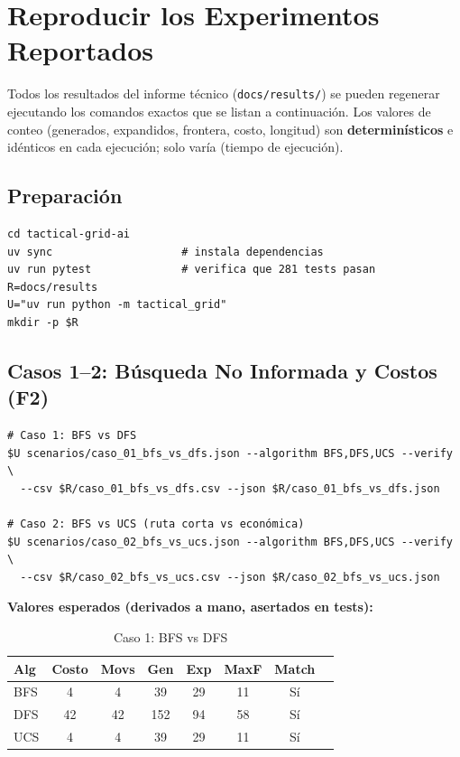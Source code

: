 \chapter{Reproducir los Experimentos Reportados}
\label{man:reproducir}

Todos los resultados del informe técnico (\texttt{docs/results/}) se pueden regenerar
ejecutando los comandos exactos que se listan a continuación. Los valores de conteo
(generados, expandidos, frontera, costo, longitud) son \textbf{determinísticos} e idénticos
en cada ejecución; solo  varía (tiempo de ejecución).

\section{Preparación}
\label{sec:prep-reproducir}

\begin{verbatim}
cd tactical-grid-ai
uv sync                    # instala dependencias
uv run pytest              # verifica que 281 tests pasan
R=docs/results
U="uv run python -m tactical_grid"
mkdir -p $R
\end{verbatim}

\section{Casos 1--2: Búsqueda No Informada y Costos (F2)}
\label{sec:rep-f2}

\begin{verbatim}
# Caso 1: BFS vs DFS
$U scenarios/caso_01_bfs_vs_dfs.json --algorithm BFS,DFS,UCS --verify \
  --csv $R/caso_01_bfs_vs_dfs.csv --json $R/caso_01_bfs_vs_dfs.json

# Caso 2: BFS vs UCS (ruta corta vs económica)
$U scenarios/caso_02_bfs_vs_ucs.json --algorithm BFS,DFS,UCS --verify \
  --csv $R/caso_02_bfs_vs_ucs.csv --json $R/caso_02_bfs_vs_ucs.json
\end{verbatim}

\textbf{Valores esperados (derivados a mano, asertados en tests):}

\begin{table}[H]
\centering
\caption{Caso 1: BFS vs DFS}
\begin{tabular}{lccccccc}
\toprule
Alg & Costo & Movs & Gen & Exp & MaxF & Match \\
\midrule
BFS & 4 & 4 & 39 & 29 & 11 & Sí \\
DFS & 42 & 42 & 152 & 94 & 58 & Sí \\
UCS & 4 & 4 & 39 & 29 & 11 & Sí \\
\bottomrule
\end{tabular}
\end{table}

